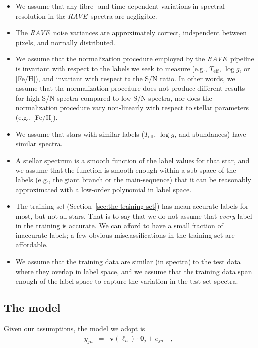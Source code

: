 \documentclass[preprint]{aastex61}
\newcommand{\acronym}[1]{{\small{#1}}}
\newcommand{\project}[1]{\textsl{#1}}
\newcommand{\rave}{\project{\acronym{RAVE}}}
\newcommand{\teff}{T_{\mathrm{eff}}}
\newcommand{\logg}{\log g}
\newcommand{\Dvector}[1]{\boldsymbol{#1}}
\newcommand{\vectheta}{\Dvector{\theta}}
\newcommand{\vecv}{\Dvector{v}}
\begin{document}
\begin{itemize}
\item We assume that any fibre- and time-dependent variations in spectral
resolution in the \rave\ spectra are negligible.
\item The \rave\ noise variances are approximately correct, independent between
pixels, and normally distributed.
\item We assume that the normalization procedure employed by the \rave\ pipeline
is invariant with respect to the labels we seek to measure (e.g., $\teff$, $\logg$,
or [Fe/H]), and invariant with respect to the S/N ratio.  In other words, we assume
that the normalization procedure does not produce different results for high S/N
spectra compared to low S/N spectra, nor does the normalization procedure vary 
non-linearly with respect to stellar parameters (e.g., [Fe/H]).
\item We assume that stars with similar labels ($\teff$, $\logg$, and abundances)
have similar spectra.
\item A stellar spectrum is a smooth function of the label values for that star,
and we assume that the function is smooth enough within a sub-space of the labels
(e.g., the giant branch or the main-sequence) that it can be reasonably approximated 
with a low-order polynomial in label space.
\item The training set (Section~\ref{sec:the-training-set}) has mean accurate labels
for most, but not all stars. That is to say that we do not assume that \emph{every} 
label in the training is accurate. We can afford to have a small fraction of 
inaccurate labels; a few obvious misclassifications in the training set are affordable.
\item We assume that the training data are similar (in spectra) to the test data 
where they overlap in label space, and we assume that the training data span enough
of the label space to capture the variation in the test-set spectra.
\end{itemize}


\subsection{The model}
\label{sec:the-model}


\noindent{}Given our assumptions, the model we adopt is
\begin{eqnarray}\label{eq:model}
y_{jn} & = & \vecv(\ell_n)\cdot\vectheta_j + e_{jn}\quad ,
\end{eqnarray}
\end{document}
